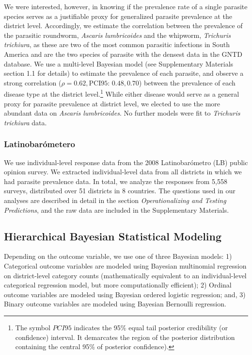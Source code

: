 \documentclass[12pt]{article}
\begin{document}
	We were interested, however, in knowing if the prevalence rate of a single parasite species serves as a justifiable proxy for generalized parasite prevalence at the district level.   Accordingly, we estimate the correlation between the prevalence of the parasitic roundworm, \textit{Ascaris lumbricoides} and the whipworm, \textit{Trichuris trichiura}, as these are two of the most common parasitic infections in South America and are the two species of parasite with the densest data in the GNTD database. We use a multi-level Bayesian model (see Supplementary Materials section 1.1 for details) to estimate the prevalence of each parasite, and observe a strong correlation ($\rho= 0.62, \text{PCI95: } 0.48, 0.70$) between the prevalence of each disease type at the district level.\footnote{The symbol $PCI95$ indicates the 95\% equal tail posterior credibility (or confidence) interval. It demarcates the region of the posterior distribution containing the central 95\% of posterior confidence).}  While either disease would serve as a general proxy for parasite prevalence at district level, we elected to use the more abundant data on \textit{Ascaris lumbricoides}. No further models were fit to \textit{Trichuris trichiura} data.

\subsubsection{Latinobarómetero}
	We use individual-level response data from the 2008 Latinobarómetro (LB) public opinion survey.   We extracted individual-level data from all districts in which we had parasite prevalence data. In total, we analyze the responses from 5,558 surveys, distributed over 51 districts in 8 countries. The questions used in our analyses are described in detail in the section \textit{Operationalizing and Testing Predictions}, and the raw data are included in the Supplementary Materials.

\subsection{Hierarchical Bayesian Statistical Modeling}
	Depending on the outcome variable, we use one of three Bayesian models: 1) Categorical outcome variables are modeled using Bayesian multinomial regression on district-level category counts (mathematically equivalent to an individual-level categorical regression model, but more computationally efficient); 2) Ordinal outcome variables are modeled using Bayesian ordered logistic regression; and, 3) Binary outcome variables are modeled using Bayesian Bernoulli regression.
\end{document}
